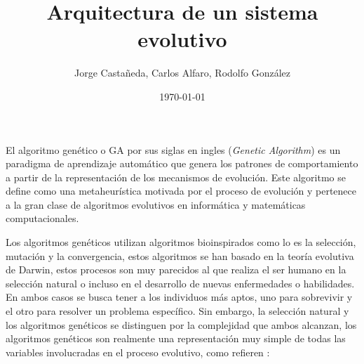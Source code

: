 \documentclass[10pt,twocolumn,a4paper]{articuloAPA}
\author{Jorge Castañeda, Carlos Alfaro, Rodolfo González}
\title{Arquitectura de un sistema evolutivo}%
\date{\today}
\begin{document}

El algoritmo genético o GA por sus siglas en ingles (\textit{Genetic Algorithm}) es un paradigma de aprendizaje automático que genera los patrones de comportamiento a partir de la representación de los mecanismos de evolución. Este algoritmo se define como una metaheurística motivada por el proceso de evolución y pertenece a la gran clase de algoritmos evolutivos en informática y matemáticas computacionales.

Los algoritmos genéticos utilizan algoritmos bioinspirados como lo es la selección, mutación y la convergencia, estos algoritmos se han basado en la teoría evolutiva de Darwin, estos procesos son muy parecidos al que realiza el ser humano en la selección natural o incluso en el desarrollo de nuevas enfermedades o habilidades. En ambos casos se busca tener a los individuos más aptos, uno para sobrevivir y el otro para resolver un problema específico. Sin embargo, la selección natural y los algoritmos genéticos se distinguen por la complejidad que ambos alcanzan, los algoritmos genéticos son realmente una representación muy simple de todas las variables involucradas en el proceso evolutivo, como refieren \textcite{gestal_2010}: 
\end{document}
